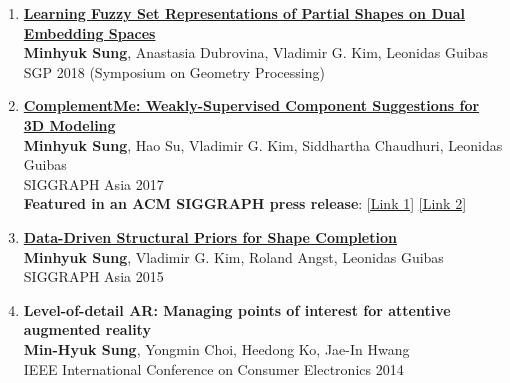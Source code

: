 \documentclass[letterpaper,10pt]{article} %
\newcommand{\blankline}{\quad\pagebreak[2]}
\begin{document}
{{\begin{enumerate}
\item \label{sgp18}
\href{https://mhsung.github.io/fuzzy-set-dual}{\textbf{Learning Fuzzy Set Representations of Partial Shapes on Dual Embedding Spaces}}\\
\textbf{Minhyuk Sung}, Anastasia Dubrovina, Vladimir G. Kim, Leonidas Guibas\\
SGP 2018 (Symposium on Geometry Processing)\\
\blankline

\item \label{siggraphasia17}
\href{https://mhsung.github.io/complement-me.html}{\textbf{ComplementMe: Weakly-Supervised Component Suggestions for 3D Modeling}}\\
\textbf{Minhyuk Sung}, Hao Su, Vladimir G. Kim, Siddhartha Chaudhuri, Leonidas Guibas\\
SIGGRAPH Asia 2017\\
{\color{linkcolor}
\textbf{Featured in an ACM SIGGRAPH press release}:
\href{https://www.eurekalert.org/pub_releases/2017-11/afcm-sad120417.php}{[Link 1]}
\href{https://scienmag.com/simplifying-assembly-based-design-for-3-d-modeling/}{[Link 2]}
}\\
\blankline

\item \label{siggraphasia15}
\href{https://mhsung.github.io/structure-completion.html}{\textbf{Data-Driven Structural Priors for Shape Completion}}\\
\textbf{Minhyuk Sung}, Vladimir G. Kim, Roland Angst, Leonidas Guibas\\
SIGGRAPH Asia 2015\\
\blankline

\item \label{icce14}
\textbf{Level-of-detail AR: Managing points of interest for attentive augmented reality}\\
\textbf{Min-Hyuk Sung}, Yongmin Choi, Heedong Ko, Jae-In Hwang\\
IEEE International Conference on Consumer Electronics 2014\\
\blankline


\end{enumerate}}}
\end{document}
